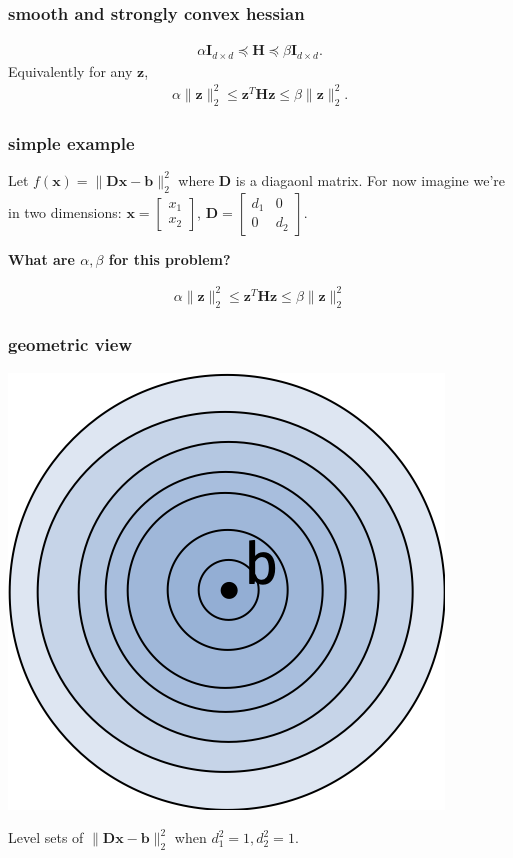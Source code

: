 \documentclass[compress]{beamer}
\newcommand{\bv}[1]{\mathbf{#1}}
\begin{document}
\begin{frame}[t]
	\frametitle{smooth and strongly convex hessian}
	\begin{align*}
		\alpha\bv{I}_{d\times d} \preceq \bv{H} \preceq \beta\bv{I}_{d\times d}.
	\end{align*}
	Equivalently for any $\bv{z}$,
	\begin{align*}
		\alpha\|\bv{z}\|_2^2 \leq \bv{z}^T\bv{H}\bv{z} \leq \beta\|\bv{z}\|_2^2.
	\end{align*} 
\end{frame}

\begin{frame}[t]
	\frametitle{simple example}
	Let $f(\bv{x}) = \|\bv{D}\bv{x} - \bv{b}\|_2^2$ where $\bv{D}$ is a diagaonl matrix. For now imagine we're in two dimensions: $\bv{x} = \begin{bmatrix}
		x_1\\
		x_2
	\end{bmatrix}$, $\bv{D} = \begin{bmatrix}
		d_1 & 0 \\
		0 & d_2
	\end{bmatrix}
	$.
	\begin{center}
		\textbf{What are $\alpha,\beta$ for this problem?}
	\end{center}
	\begin{align*}
		\alpha\|\bv{z}\|_2^2 \leq \bv{z}^T\bv{H}\bv{z} \leq \beta\|\bv{z}\|_2^2
	\end{align*}
\end{frame}

\begin{frame}[t]
	\frametitle{geometric view}
	\begin{center}
		\includegraphics[width=.5\textwidth]{perfect_conditioning.png}
		
		Level sets of $\|\bv{D}\bv{x} - \bv{b}\|_2^2$ when $d_1^2 = 1, d_2^2 = 1$. 
	\end{center}
\end{frame}
\end{document}
